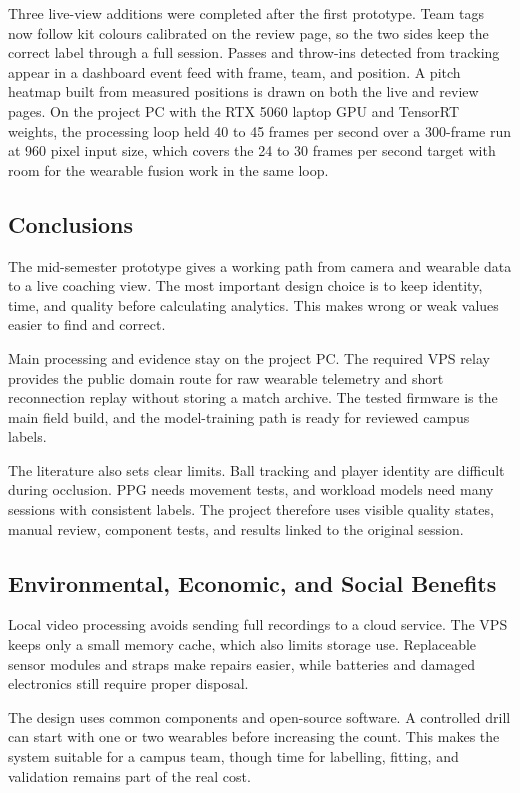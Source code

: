 Three live-view additions were completed after the first prototype. Team tags
now follow kit colours calibrated on the review page, so the two sides keep the
correct label through a full session. Passes and throw-ins detected from
tracking appear in a dashboard event feed with frame, team, and position. A
pitch heatmap built from measured positions is drawn on both the live and
review pages. On the project PC with the RTX 5060 laptop GPU and TensorRT
weights, the processing loop held 40 to 45 frames per second over a 300-frame
run at 960 pixel input size, which covers the 24 to 30 frames per second target
with room for the wearable fusion work in the same loop.

\subsection{Conclusions}
The mid-semester prototype gives a working path from camera and wearable data to
a live coaching view. The most important design choice is to keep identity,
time, and quality before calculating analytics. This makes wrong or weak values
easier to find and correct.

Main processing and evidence stay on the project PC. The required VPS relay
provides the public domain route for raw wearable telemetry and short
reconnection replay without storing a match archive. The tested firmware is the
main field build, and the model-training path is ready for reviewed campus
labels.

The literature also sets clear limits. Ball tracking and player identity are
difficult during occlusion. PPG needs movement tests, and workload models need
many sessions with consistent labels. The project therefore uses visible
quality states, manual review, component tests, and results linked to the
original session.

\subsection{Environmental, Economic, and Social Benefits}
Local video processing avoids sending full recordings to a cloud service. The
VPS keeps only a small memory cache, which also limits storage use. Replaceable
sensor modules and straps make repairs easier, while batteries and damaged
electronics still require proper disposal.

The design uses common components and open-source software. A controlled drill
can start with one or two wearables before increasing the count. This makes the
system suitable for a campus team, though time for labelling, fitting, and
validation remains part of the real cost.

